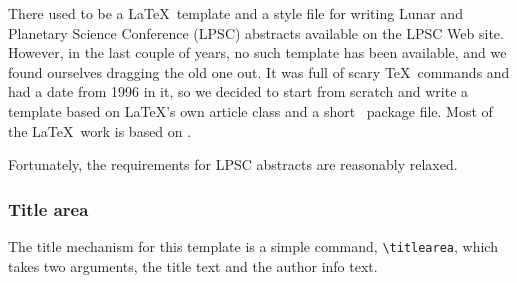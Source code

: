 \documentclass[twoside]{article}
\begin{document}


%

%



There used to be a \LaTeX\ template and a style file for writing
Lunar and Planetary Science Conference (LPSC) abstracts available
on the LPSC Web site.  However, in the last couple of years, no
such template has been available, and we found ourselves dragging
the old one out.  It was full of scary \TeX\ commands and had a
date from 1996 in it, so we decided to start from scratch and write
a template based on \LaTeX's own article class and a short \LaTeXe\
package file.  Most of the \LaTeX\ work is based on \citet{latexguide}.

Fortunately, the requirements for LPSC abstracts \citep{LPSC} are
reasonably relaxed.

\subsubsection*{Title area}

The title mechanism for this template is a simple command,
\verb=\titlearea=, which takes two arguments, the title text and the
author info text.
\end{document}
